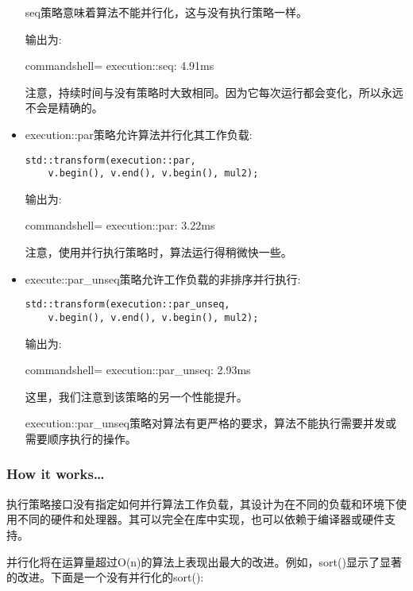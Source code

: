 \begin{itemize}
seq策略意味着算法不能并行化，这与没有执行策略一样。

输出为:

\begin{tcblisting}{commandshell={}}
execution::seq: 4.91ms
\end{tcblisting}

注意，持续时间与没有策略时大致相同。因为它每次运行都会变化，所以永远不会是精确的。

\item 
execution::par策略允许算法并行化其工作负载:

\begin{lstlisting}[style=styleCXX]
std::transform(execution::par,
	v.begin(), v.end(), v.begin(), mul2);
\end{lstlisting}

输出为:

\begin{tcblisting}{commandshell={}}
execution::par: 3.22ms
\end{tcblisting}

注意，使用并行执行策略时，算法运行得稍微快一些。

\item 
execute::par\_unseq策略允许工作负载的非排序并行执行:

\begin{lstlisting}[style=styleCXX]
std::transform(execution::par_unseq,
	v.begin(), v.end(), v.begin(), mul2);
\end{lstlisting}

输出为:

\begin{tcblisting}{commandshell={}}
execution::par_unseq: 2.93ms
\end{tcblisting}

这里，我们注意到该策略的另一个性能提升。

execution::par\_unseq策略对算法有更严格的要求，算法不能执行需要并发或需要顺序执行的操作。
\end{itemize}

\subsubsection{How it works…}

执行策略接口没有指定如何并行算法工作负载，其设计为在不同的负载和环境下使用不同的硬件和处理器。其可以完全在库中实现，也可以依赖于编译器或硬件支持。

并行化将在运算量超过O(n)的算法上表现出最大的改进。例如，sort()显示了显著的改进。下面是一个没有并行化的sort():


